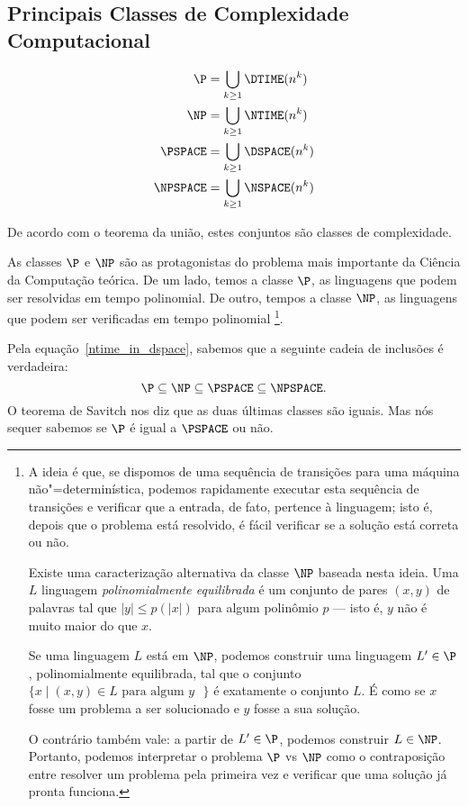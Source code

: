 \subsection{Principais Classes de Complexidade Computacional}
\label{principais_classes}

\begin{definition}
    \begin{align*}
        \P &= \bigcup_{k \geq 1} \DTIME(n^k) \\
        \NP &= \bigcup_{k \geq 1} \NTIME(n^k) \\
        \PSPACE &= \bigcup_{k \geq 1} \DSPACE(n^k) \\
        \NPSPACE &= \bigcup_{k \geq 1} \NSPACE(n^k) \\
    \end{align*}
\end{definition}

De acordo com o teorema da união,
estes conjuntos são classes de complexidade.

As classes $\P$ e $\NP$ são as protagonistas
do problema mais importante da Ciência da Computação teórica.
De um lado, temos a classe $\P$,
as linguagens que podem ser resolvidas em tempo polinomial.
De outro, tempos a classe $\NP$,
as linguagens que podem ser verificadas em tempo polinomial%
\footnote{
    \label{polinomialmente_equilibrada}
    A ideia é que,
    se dispomos de uma sequência de transições para uma máquina não"=determinística,
    podemos rapidamente executar esta sequência de transições
    e verificar que a entrada, de fato, pertence à linguagem;
    isto é, depois que o problema está resolvido,
    é fácil verificar se a solução está correta ou não.

    Existe uma caracterização alternativa da classe $\NP$ baseada nesta ideia.
    Uma $L$ linguagem \emph{polinomialmente equilibrada}
    é um conjunto de pares $(x, y)$ de palavras
    tal que $|y| \leq p(|x|)$ para algum polinômio $p$
    \cite[p.~298]{Papadimitriou1998}
    --- isto é, $y$ não é muito maior do que $x$.

    Se uma linguagem $L$ está em $\NP$,
    podemos construir uma linguagem $L' \in \P$,
    polinomialmente equilibrada,
    tal que o conjunto $\{x \mid (x, y) \in L \text{ para algum $y$ }\}$
    é exatamente o conjunto $L$.
    É como se $x$ fosse um problema a ser solucionado
    e $y$ fosse a sua solução.

    O contrário também vale: a partir de $L' \in \P$,
    podemos construir $L \in \NP$.
    Portanto, podemos interpretar o problema $\P$ vs $\NP$
    como o contraposição entre resolver um problema pela primeira vez
    e verificar que uma solução já pronta funciona.
}.

Pela equação~\ref{ntime_in_dspace},
sabemos que a seguinte cadeia de inclusões é verdadeira:
\begin{equation*}
    \P \subseteq \NP \subseteq \PSPACE \subseteq \NPSPACE.
\end{equation*}
O teorema de Savitch nos diz que as duas últimas classes são iguais.
Mas nós sequer sabemos se $\P$ é igual a $\PSPACE$ ou não.
